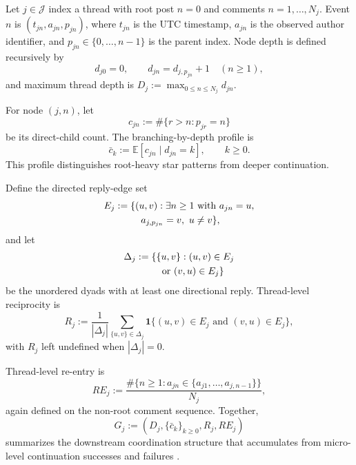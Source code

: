 Let \(j \in \mathcal{J}\) index a thread with root post \(n=0\) and comments
\(n=1,\ldots,N_j\). Event \(n\) is \((t_{jn},a_{jn},p_{jn})\), where
\(t_{jn}\) is the UTC timestamp, \(a_{jn}\) is the observed author identifier,
and \(p_{jn}\in\{0,\ldots,n-1\}\) is the parent index. Node depth is defined
recursively by
\begin{equation}
\label{eq:depth}
d_{j0}=0,
\qquad
d_{jn}=d_{j,p_{jn}}+1 \quad (n\ge 1),
\end{equation}
and maximum thread depth is \(D_j:=\max_{0\le n\le N_j} d_{jn}\).

For node \((j,n)\), let
\[
c_{jn}:=\#\{r>n : p_{jr}=n\}
\]
be its direct-child count. The branching-by-depth profile is
\begin{equation}
\label{eq:branching-by-depth}
\bar c_k := \mathbb{E}\!\left[c_{jn}\mid d_{jn}=k\right], \qquad k\ge 0.
\end{equation}
This profile distinguishes root-heavy star patterns from deeper continuation.

Define the directed reply-edge set
\[
\begin{aligned}
E_j
&:=\{(u,v): \exists n\ge 1 \text{ with } a_{jn}=u,\\
&\hspace{2.7em} a_{j,p_{jn}}=v,\ u\neq v\},
\end{aligned}
\]
and let
\[
\begin{aligned}
\Delta_j
&:=\{\{u,v\} : (u,v)\in E_j\\
&\hspace{2.7em} \text{or } (v,u)\in E_j\}
\end{aligned}
\]
be the unordered dyads with at least one directional reply. Thread-level
reciprocity is
\begin{equation}
\label{eq:reciprocity-rate}
R_j
:=\frac{1}{|\Delta_j|}\sum_{\{u,v\}\in \Delta_j}
\mathbf{1}\{(u,v)\in E_j \text{ and } (v,u)\in E_j\},
\end{equation}
with \(R_j\) left undefined when \(|\Delta_j|=0\).

Thread-level re-entry is
\begin{equation}
\label{eq:reentry-rate}
RE_j
:=\frac{\#\{n\ge 1 : a_{jn}\in\{a_{j1},\ldots,a_{j,n-1}\}\}}{N_j},
\end{equation}
again defined on the non-root comment sequence. Together,
\[
G_j := \left(D_j,\{\bar c_k\}_{k\ge 0},R_j,RE_j\right)
\]
summarizes the downstream coordination structure that accumulates from
micro-level continuation successes and failures
\citep{harris1963theory,gomez2013structure,aragon2017thread,meital2024branch}.

